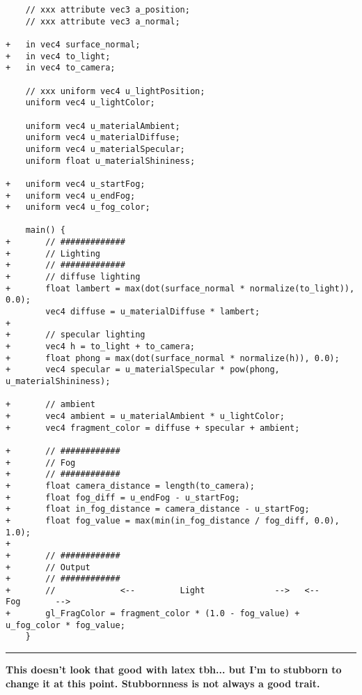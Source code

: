 \small
\begin{lstlisting}
    // xxx attribute vec3 a_position; 
    // xxx attribute vec3 a_normal; 

+   in vec4 surface_normal;
+   in vec4 to_light;
+   in vec4 to_camera;

    // xxx uniform vec4 u_lightPosition;
    uniform vec4 u_lightColor; 
 
    uniform vec4 u_materialAmbient; 
    uniform vec4 u_materialDiffuse; 
    uniform vec4 u_materialSpecular; 
    uniform float u_materialShininess; 

+   uniform vec4 u_startFog;
+   uniform vec4 u_endFog;
+   uniform vec4 u_fog_color;

    main() {
+       // #############
+       // Lighting
+       // #############
+       // diffuse lighting
+       float lambert = max(dot(surface_normal * normalize(to_light)), 0.0);
        vec4 diffuse = u_materialDiffuse * lambert;
+
+       // specular lighting
+       vec4 h = to_light + to_camera;
+       float phong = max(dot(surface_normal * normalize(h)), 0.0);
+       vec4 specular = u_materialSpecular * pow(phong, u_materialShininess);

+       // ambient
+       vec4 ambient = u_materialAmbient * u_lightColor;
+       vec4 fragment_color = diffuse + specular + ambient;

+       // ############
+       // Fog
+       // ############
+       float camera_distance = length(to_camera);
+       float fog_diff = u_endFog - u_startFog;
+       float in_fog_distance = camera_distance - u_startFog;
+       float fog_value = max(min(in_fog_distance / fog_diff, 0.0), 1.0);
+
+       // ############
+       // Output
+       // ############
+       //             <--         Light              -->   <--       Fog       -->
+       gl_FragColor = fragment_color * (1.0 - fog_value) + u_fog_color * fog_value;
    }
\end{lstlisting}
\normalsize

\rule{\textwidth}{0.2mm}

\textbf{This doesn't look that good with latex tbh... but I'm to stubborn to change it at this point. Stubbornness is not always a good trait.}
